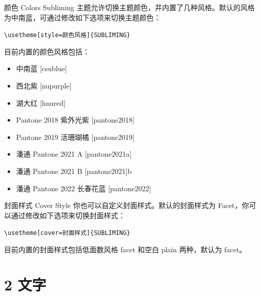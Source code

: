 \documentclass[10pt,aspectratio=169,fontset=none]{ctexbeamer}
\begin{document}
    \begin{frame}{颜色 Colors}
        Subliming 主题允许切换主题颜色，并内置了几种风格。默认的风格为中南蓝，可通过修改如下选项来切换主题颜色：
        
        \begin{center}
            \texttt{\textcolor{primary}{\textbackslash usetheme}[style=颜色风格]\alert{\{SUBLIMING\}}}
        \end{center}
        
        目前内置的颜色风格包括：

       \begin{itemize}
            \item \textcolor[HTML]{186199}{中南蓝 [csublue]}
            \item \textcolor[RGB]{078, 042, 132}{西北紫 [nupurple]}
            \item \textcolor[HTML]{A00000}{湖大红 [hnured]}
            \item \textcolor[HTML]{8262AC}{Pantone 2018 紫外光紫 [pantone2018]}
            \item \textcolor[HTML]{F36F63}{Pantone 2019 活珊瑚橘 [pantone2019]}
            \item \textcolor[HTML]{0283B1}{潘通    Pantone 2021 A [pantone2021a]}
            \item \textcolor[HTML]{AE95CC}{潘通    Pantone 2021 B [pantone2021]b}
            \item \textcolor[HTML]{6868AD}{潘通    Pantone 2022 长春花蓝 [pantone2022]}
        \end{itemize}  
       
    \end{frame}
    
    \begin{frame}{封面样式 Cover Style}
        你也可以自定义封面样式。默认的封面样式为 Facet，你可以通过修改如下选项来切换封面样式：
        \begin{center}
            \texttt{\textcolor{primary}{\textbackslash usetheme}[cover=封面样式]\alert{\{SUBLIMING\}}}
        \end{center}

        目前内置的封面样式包括低面数风格 facet 和空白 plain 两种，默认为 facet。
    \end{frame}


    \section{2 文字}
\end{document}
